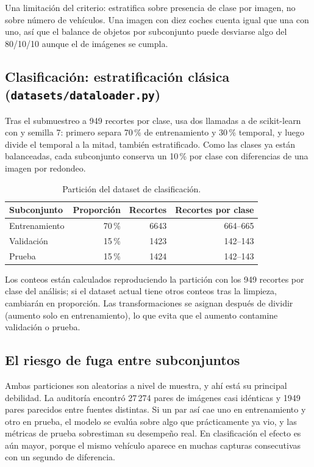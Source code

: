 \documentclass[11pt,a4paper]{article}
\begin{document}
Una limitación del criterio: estratifica sobre presencia de clase por imagen, no sobre número de vehículos. Una imagen con diez coches cuenta igual que una con uno, así que el balance de objetos por subconjunto puede desviarse algo del 80/10/10 aunque el de imágenes se cumpla.

\subsection{Clasificación: estratificación clásica (\texorpdfstring{\texttt{datasets/dataloader.py}}{datasets/dataloader.py})}

Tras el submuestreo a 949 recortes por clase,  usa dos llamadas a  de scikit-learn con  y semilla 7: primero separa 70\,\% de entrenamiento y 30\,\% temporal, y luego divide el temporal a la mitad, también estratificado. Como las clases ya están balanceadas, cada subconjunto conserva un 10\,\% por clase con diferencias de una imagen por redondeo.

\begin{table}[h]
\centering
\caption{Partición del dataset de clasificación.}
\begin{tabular}{lrrr}
\toprule
Subconjunto & Proporción & Recortes & Recortes por clase \\
\midrule
Entrenamiento & 70\,\% & 6643 & 664--665 \\
Validación & 15\,\% & 1423 & 142--143 \\
Prueba & 15\,\% & 1424 & 142--143 \\
\bottomrule
\end{tabular}
\end{table}

Los conteos están calculados reproduciendo la partición con los 949 recortes por clase del análisis; si el dataset actual tiene otros conteos tras la limpieza, cambiarán en proporción. Las transformaciones se asignan después de dividir (aumento solo en entrenamiento), lo que evita que el aumento contamine validación o prueba.

\subsection{El riesgo de fuga entre subconjuntos}

Ambas particiones son aleatorias a nivel de muestra, y ahí está su principal debilidad. La auditoría encontró 27\,274 pares de imágenes casi idénticas y 1949 pares parecidos entre fuentes distintas. Si un par así cae uno en entrenamiento y otro en prueba, el modelo se evalúa sobre algo que prácticamente ya vio, y las métricas de prueba sobrestiman su desempeño real. En clasificación el efecto es aún mayor, porque el mismo vehículo aparece en muchas capturas consecutivas con un segundo de diferencia.
\end{document}
